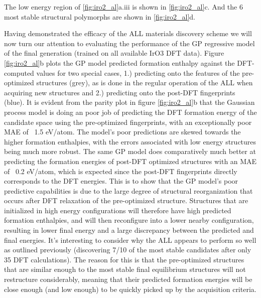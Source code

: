 %
The low energy region of \ref{fig:iro2_al}a.iii is shown in \ref{fig:iro2_al}c.
%
And the 6 most stable structural polymorphs are shown in \ref{fig:iro2_al}d.


Having demonstrated the efficacy of the ALL materials discovery scheme we will now turn our attention to evaluating the performance of the GP regressive model of the final generation (trained on all available IrO3 DFT data).
%
Figure \ref{fig:iro2_al}b plots the GP model predicted formation enthalpy against the DFT-computed values for two special cases,
1.) predicting onto the features of the pre-optimized structures (grey), as is done in the regular operation of the ALL when acquiring new structures and
2.) predicting onto the post-DFT fingerprints (blue).
%
It is evident from the parity plot in figure \ref{fig:iro2_al}b that the Gaussian process model is doing an poor job of predicting the DFT formation energy of the candidate space using the pre-optimized fingerprints,
with an exceptionally poor MAE of ~1.5 eV/atom.
%
The model's poor predictions are skewed towards the higher formation enthalpies, with the errors associated with low energy structures being much more robust.
%
The same GP model does comparatively much better at predicting the formation energies of post-DFT optimized structures with an MAE of ~0.2 eV/atom,
which is expected since the post-DFT fingerprints directly corresponds to the DFT energies.
%
This is to show that the GP model's poor predictive capabilities is due to the large degree of structural reorganization that occurs after DFT relaxation of the pre-optimized structure.
%
Structures that are initialized in high energy configurations will therefore have high predicted formation enthalpies, and will then reconfigure into a lower nearby configuration, resulting in lower final energy and a large discrepancy between the predicted and final energies.
%
It's interesting to consider why the ALL appears to perform so well as outlined previously (discovering 7/10 of the most stable candidates after only 35 DFT calculations).
%
The reason for this is that the pre-optimized structures that are similar enough to the most stable final equilibrium structures will not restructure considerably, meaning that their predicted formation energies will be close enough (and low enough) to be quickly picked up by the acquisition criteria.
%



